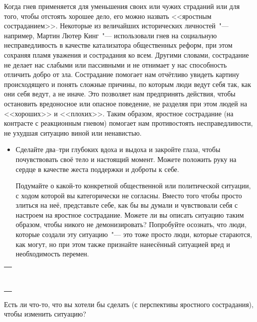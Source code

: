 Когда гнев применяется для уменьшения своих или чужих страданий или для того, чтобы отстоять хорошее дело, его можно назвать <<яростным состраданием>>. Некоторые из величайших исторических личностей~"--- например, Мартин Лютер Кинг~"--- использовали гнев на социальную несправедливость в качестве катализатора общественных реформ, при этом сохраняя пламя уважения и сострадания ко всем. Другими словами, сострадание не делает нас слабыми или пассивными и не отнимает у нас способность отличить добро от зла. Сострадание помогает нам отчётливо увидеть картину происходящего и понять сложные причины, по которым люди ведут себя так, как они себя ведут, а не иначе. Это позволяет нам предпринять действия, чтобы остановить вредоносное или опасное поведение, не разделяя при этом людей на <<хороших>> и <<плохих>>. Таким образом, яростное сострадание (на контрасте с реакционным гневом) помогает нам противостоять несправедливости, не ухудшая ситуацию виной или ненавистью.
\begin{itemize}
	\item Сделайте два--три глубоких вдоха и выдоха и закройте глаза, чтобы почувствовать своё тело и настоящий момент. Можете положить руку на сердце в качестве жеста поддержки и доброты к себе.
	
	\itemWritingHand Подумайте о какой-то конкретной общественной или политической ситуации, с ходом которой вы категорически не согласны. Вместо того чтобы просто злиться на неё, представьте себе, как бы вы думали и чувствовали себя с настроем на яростное сострадание. Можете ли вы описать ситуацию таким образом, чтобы никого не демонизировать? Попробуйте осознать, что люди, которые создали эту ситуацию~"--- это тоже просто люди, которые стараются, как могут, но при этом также признайте нанесённый ситуацией вред и необходимость перемен.
\end{itemize}

\setlength{\extrarowheight}{2mm}
\begin{tabularx}{0.96\textwidth}{X}
	\\
	\arrayrulecolor{gray}\hline\\
	\hline\\
	\hline\\
	\hline\\
	\hline\\
	\hline\\	
	\hline\\
	\hline\\
	\hline\\
\end{tabularx}
\setlength{\extrarowheight}{0mm}
\begin{itemize}
	\itemWritingHand Есть ли что-то, что вы хотели бы сделать (с перспективы яростного сострадания), чтобы изменить ситуацию?
\end{itemize}

